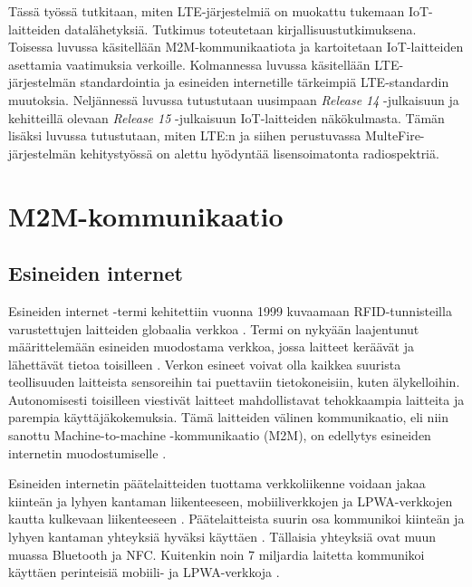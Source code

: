 \documentclass[finnish, 12pt, a4paper, elec, latin1, utf8, online]{aaltothesis}
\begin{document}
Tässä työssä tutkitaan, miten LTE-järjestelmiä on muokattu tukemaan IoT-laitteiden datalähetyksiä. Tutkimus toteutetaan kirjallisuustutkimuksena. Toisessa luvussa käsitellään M2M-kommunikaatiota ja kartoitetaan IoT-laitteiden asettamia vaatimuksia verkoille. Kolmannessa luvussa käsitellään LTE-järjestelmän standardointia ja esineiden internetille tärkeimpiä LTE-standardin muutoksia. Neljännessä luvussa tutustutaan uusimpaan \textit{Release 14} -julkaisuun ja kehitteillä olevaan \textit{Release 15} -julkaisuun IoT-laitteiden näkökulmasta. Tämän lisäksi luvussa tutustutaan, miten LTE:n ja siihen perustuvassa MulteFire-järjestelmän kehitystyössä on alettu hyödyntää lisensoimatonta radiospektriä.

\clearpage
\section{M2M-kommunikaatio}

\subsection{Esineiden internet}

Esineiden internet -termi kehitettiin vuonna 1999 kuvaamaan RFID-tunnisteilla varustettujen laitteiden globaalia verkkoa \cite{sundmaeker2010vision}. Termi on nykyään laajentunut määrittelemään esineiden muodostama verkkoa, jossa laitteet keräävät ja lähettävät tietoa toisilleen \cite{atzori2010internet}. Verkon esineet voivat olla kaikkea suurista teollisuuden laitteista sensoreihin tai puettaviin tietokoneisiin, kuten älykelloihin. Autonomisesti toisilleen viestivät laitteet mahdollistavat tehokkaampia laitteita ja parempia käyttäjäkokemuksia. Tämä laitteiden välinen kommunikaatio, eli niin sanottu Machine-to-machine -kommunikaatio (M2M), on edellytys esineiden internetin muodostumiselle \cite{nokiawhitepaper}.



Esineiden internetin päätelaitteiden tuottama verkkoliikenne voidaan jakaa kiinteän ja lyhyen kantaman liikenteeseen, mobiiliverkkojen ja LPWA-verkkojen kautta kulkevaan liikenteeseen \cite{nokiawhitepaper, harmaala}. Päätelaitteista suurin osa kommunikoi kiinteän ja lyhyen kantaman yhteyksiä hyväksi käyttäen \cite{nokiawhitepaper}. Tällaisia yhteyksiä ovat muun muassa Bluetooth ja NFC. Kuitenkin noin 7 miljardia laitetta kommunikoi käyttäen perinteisiä mobiili- ja LPWA-verkkoja \cite{nokiawhitepaper}.
\end{document}
